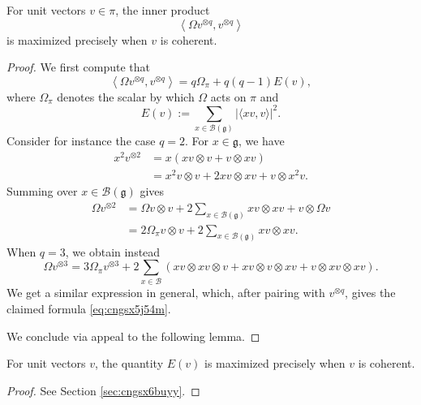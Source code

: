 \documentclass[reqno]{amsart} 
\begin{document}
\begin{lemma}\label{lemma:cngsx4g21h}
  For unit vectors $v \in \pi$, the inner product
  \begin{equation*}
    \left\langle \Omega v^{\otimes q}, v^{\otimes q} \right\rangle
  \end{equation*}
  is maximized precisely when $v$ is coherent.
\end{lemma}
\begin{proof}
  We first compute that
  \begin{equation}\label{eq:cngsx5j54m}
    \left\langle \Omega v^{\otimes q}, v^{\otimes q} \right\rangle
    =
    q
    \Omega_\pi + q(q - 1) E(v),
  \end{equation}
  where $\Omega_\pi$ denotes the scalar by which $\Omega$ acts on $\pi$ and
  \begin{equation*}
    E(v) := \sum_{x \in \mathcal{B}(\mathfrak{g})}
    \left\lvert \langle x v, v \rangle \right\rvert^2.
  \end{equation*}
  Consider for instance the case $q = 2$.  For $x \in \mathfrak{g}$, we have
  \begin{align*}
    x^2 v^{\otimes 2} &= x \left( x v \otimes v +
                        v \otimes x v \right) \\
                      &=
                        x^2 v \otimes v + 2 x v \otimes x v + v \otimes x^2 v.
  \end{align*}
  Summing over $x \in \mathcal{B}(\mathfrak{g})$ gives
  \begin{align*}
    \Omega v^{\otimes 2} &= \Omega v \otimes v + 2 \sum_{x \in \mathcal{B}(\mathfrak{g})} x v \otimes x v+ v \otimes \Omega v  \\
                         &= 2 \Omega_\pi v \otimes v + 2 \sum_{x \in \mathcal{B}(\mathfrak{g})} x v \otimes x v.
  \end{align*}
  When $q = 3$, we obtain instead
  \begin{equation*}
    \Omega v^{\otimes 3} = 3 \Omega_\pi v^{\otimes 3} + 2 \sum_{x \in \mathcal{B}} \left(
      x v \otimes x v \otimes v
      + x v \otimes v \otimes x v
      + v \otimes x v \otimes x v
    \right).
  \end{equation*}
  We get a similar expression in general, which, after pairing with $v^{\otimes q}$, gives the claimed formula \eqref{eq:cngsx5j54m}.

  We conclude via appeal to the following lemma.
\end{proof}

\begin{lemma}\label{lemma:cngsx4g4hz}
  For unit vectors $v$, the quantity $E(v)$ is maximized precisely when $v$ is coherent.
\end{lemma}
\begin{proof}
  See Section \ref{sec:cngsx6buyy}.
\end{proof}
\end{document}
